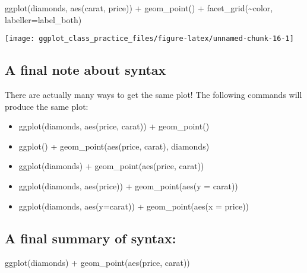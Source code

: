 \documentclass[
]{article}
\newenvironment{Shaded}{\begin{snugshade}}{\end{snugshade}}
\newcommand{\AttributeTok}[1]{\textcolor[rgb]{0.77,0.63,0.00}{#1}}
\newcommand{\FunctionTok}[1]{\textcolor[rgb]{0.00,0.00,0.00}{#1}}
\newcommand{\NormalTok}[1]{#1}
\newcommand{\SpecialCharTok}[1]{\textcolor[rgb]{0.00,0.00,0.00}{#1}}
\providecommand{\tightlist}{%
  \setlength{\itemsep}{0pt}\setlength{\parskip}{0pt}}
\begin{document}
\begin{Shaded}
\begin{Highlighting}[]
\FunctionTok{ggplot}\NormalTok{(diamonds, }\FunctionTok{aes}\NormalTok{(carat, price)) }\SpecialCharTok{+} \FunctionTok{geom\_point}\NormalTok{() }\SpecialCharTok{+}
 \FunctionTok{facet\_grid}\NormalTok{(}\SpecialCharTok{\textasciitilde{}}\NormalTok{color, }\AttributeTok{labeller=}\NormalTok{label\_both)}
\end{Highlighting}
\end{Shaded}

\begin{center}\texttt{[image: ggplot\_class\_practice\_files/figure-latex/unnamed-chunk-16-1]} \end{center}

\hypertarget{a-final-note-about-syntax}{%
\subsection{A final note about syntax}\label{a-final-note-about-syntax}}

There are actually many ways to get the same plot! The following
commands will produce the same plot:

\begin{itemize}
\tightlist
\item
  ggplot(diamonds, aes(price, carat)) + geom\_point()
\item
  ggplot() + geom\_point(aes(price, carat), diamonds)
\item
  ggplot(diamonds) + geom\_point(aes(price, carat))
\item
  ggplot(diamonds, aes(price)) + geom\_point(aes(y = carat))
\item
  ggplot(diamonds, aes(y=carat)) + geom\_point(aes(x = price))
\end{itemize}

\hypertarget{a-final-summary-of-syntax}{%
\subsection{A final summary of
syntax:}\label{a-final-summary-of-syntax}}

\begin{Shaded}
\begin{Highlighting}[]
\FunctionTok{ggplot}\NormalTok{(diamonds) }\SpecialCharTok{+} \FunctionTok{geom\_point}\NormalTok{(}\FunctionTok{aes}\NormalTok{(price, carat))}
\end{Highlighting}
\end{Shaded}
\end{document}
